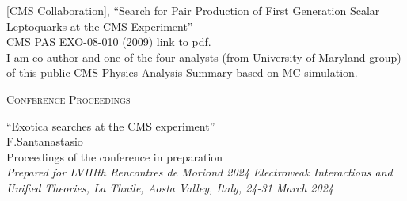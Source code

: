 \documentclass[10pt, a4paper]{article}
\begin{document}
\begin{thebibliography}{599}
[CMS Collaboration],
``Search for Pair Production of First Generation Scalar Leptoquarks at the CMS Experiment''\\
  CMS PAS EXO-08-010 (2009)
  \href{http://cdsweb.cern.ch/record/1196076/files/EXO-08-010-pas.pdf}{link
  to pdf}.
  \\I am co-author and one of the four analysts (from University of Maryland group) of this public CMS Physics Analysis Summary based on MC simulation.
  


\vspace{0.1cm} \begin{center} \textsc{Conference Proceedings} \end{center} \vspace{0.05cm}

``Exotica searches at the CMS experiment''\\
 F.Santanastasio\\
  Proceedings of the conference in preparation \\
{\it Prepared for LVIIIth Rencontres de Moriond 2024 Electroweak Interactions and Unified Theories, La Thuile, Aosta Valley, Italy, 24-31 March 2024}


\end{thebibliography}
\end{document}
